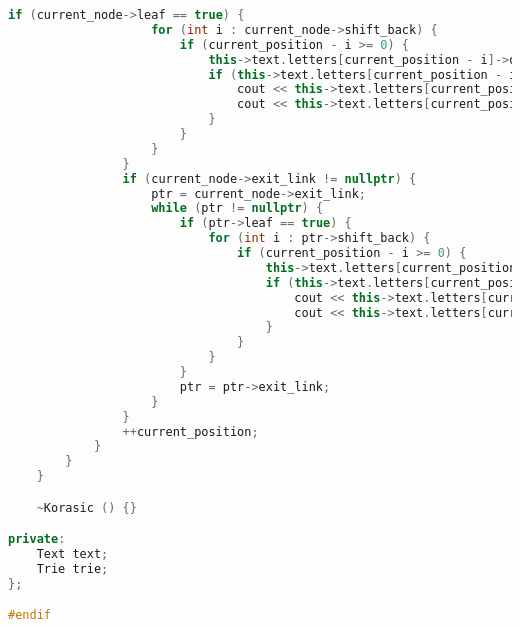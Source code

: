 \begin{lstlisting}[language=C++]
                if (current_node->leaf == true) {
                    for (int i : current_node->shift_back) {
                        if (current_position - i >= 0) {
                            this->text.letters[current_position - i]->overlap += 1;
                            if (this->text.letters[current_position - i]->overlap == this->trie.word_counter + 1) {
                                cout << this->text.letters[current_position - i]->line << ", ";
                                cout << this->text.letters[current_position - i]->column << "\n";
                            }
                        }
                    }
                }
                if (current_node->exit_link != nullptr) {
                    ptr = current_node->exit_link;
                    while (ptr != nullptr) {
                        if (ptr->leaf == true) {
                            for (int i : ptr->shift_back) {
                                if (current_position - i >= 0) {
                                    this->text.letters[current_position - i]->overlap += 1;
                                    if (this->text.letters[current_position - i]->overlap == this->trie.word_counter + 1) {
                                        cout << this->text.letters[current_position - i]->line << ", ";
                                        cout << this->text.letters[current_position - i]->column << "\n";
                                    }
                                }
                            }
                        }
                        ptr = ptr->exit_link;
                    }
                }
                ++current_position;
            }
        }
    }

    ~Korasic () {}

private:
    Text text;
    Trie trie;
};

#endif

\end{lstlisting}

\pagebreak

